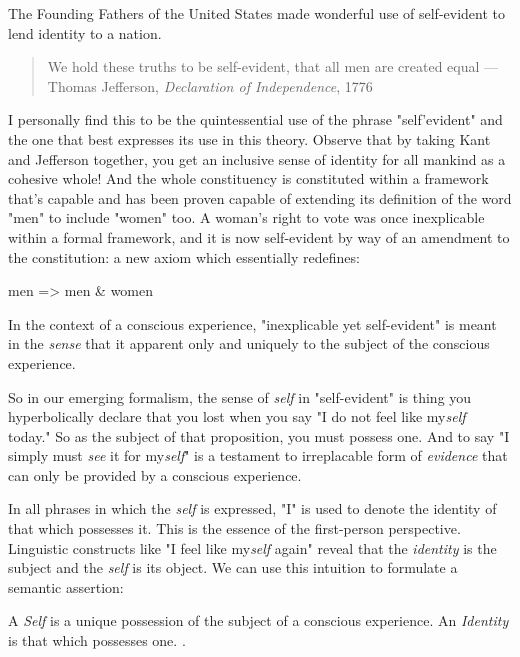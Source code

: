 \documentclass[runningheads]{llncs}
\begin{document}
The Founding Fathers of the United States made wonderful use of self-evident to lend identity to a nation.

\begin{quote}
We hold these truths to be self-evident, that all men are created equal --- Thomas Jefferson, \emph{Declaration of Independence}, 1776
\end{quote}

I personally find this to be the quintessential use of the phrase "self'evident" and the one that best expresses its use in this theory. Observe that by taking Kant and Jefferson together, you get an inclusive sense of identity for all mankind as a cohesive whole! And the whole constituency is constituted within a framework that's capable and has been proven capable of extending its definition of the word "men" to include "women" too. A woman's right to vote was once inexplicable within a formal framework, and it is now self-evident by way of an amendment to the constitution: a new axiom which essentially redefines: 

men => men \& women

In the context of a conscious experience, "inexplicable yet self-evident" is meant in the \emph{sense} that it apparent only and uniquely to the subject of the conscious experience. 

So in our emerging formalism, the sense of \emph{self} in "self-evident" is thing you hyperbolically declare that you lost when you say "I do not feel like my\emph{self} today." So as the subject of that proposition, you must possess one. And to say "I simply must \emph{see} it for my\emph{self}" is a testament to irreplacable form of \emph{evidence} that can only be provided by a conscious experience.

In all phrases in which the \emph{self} is expressed, "I" is used to denote the identity of that which possesses it. This is the essence of the first-person perspective. Linguistic constructs like "I feel like my\emph{self} again" reveal that the \emph{identity} is the subject and the \emph{self} is its object. We can use this intuition to formulate a semantic assertion: 

\setcounter{definition}{0}
\begin{assertion}
	A \emph{Self} is a unique possession of the subject of a conscious experience. An \emph{Identity} is that which possesses one. \cite{Formalism}.
\end{assertion}
\end{document}
